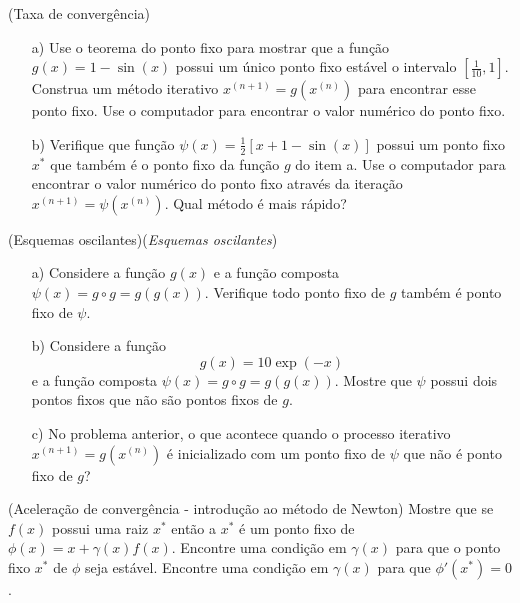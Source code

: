 \begin{exer}(Taxa de convergência)
\begin{itemize}
\item[a)] Use o teorema do ponto fixo para mostrar que a função $g(x)=1-\sin(x)$ possui um único ponto fixo estável o intervalo $[\frac{1}{10},1]$. Construa um método iterativo $x^{(n+1)}=g(x^{(n)})$ para encontrar esse ponto fixo. Use o computador para encontrar o valor numérico do ponto fixo.
\item[b)] Verifique que função $\psi(x)=\frac{1}{2}\left[x+1-\sin(x)\right]$ possui um ponto fixo $x^*$ que também é o ponto fixo da função $g$ do item a. Use o computador para encontrar o valor numérico do ponto fixo através da iteração $x^{(n+1)}=\psi(x^{(n)})$. Qual método é mais rápido?
\end{itemize}
\end{exer}


\begin{exer}(Esquemas oscilantes)(\textit{Esquemas oscilantes})
\begin{itemize}
\item[a)] Considere a função $g(x)$ e a função composta $\psi(x)=g\circ g=g\left(g(x)\right)$. Verifique todo ponto fixo de $g$ também é ponto fixo de $\psi$.

\item[b)]  Considere a função \begin{equation} g(x)=10\exp(-x) \end{equation} e a função composta $\psi(x)=g\circ g=g\left(g(x)\right)$. Mostre que $\psi$ possui dois pontos fixos que não são pontos fixos de $g$.

\item[c)]  No problema anterior, o que acontece quando o processo iterativo $x^{(n+1)}=g(x^{(n)})$ é inicializado com um ponto fixo de $\psi$ que não é ponto fixo de $g$?
\end{itemize}
\end{exer}

\begin{exer}(Aceleração de convergência - introdução ao método de Newton)\label{int_new1} Mostre que se $f(x)$ possui uma raiz $x^*$ então a $x^*$ é um ponto fixo de $\phi(x)=x+\gamma(x) f(x)$. Encontre uma condição em $\gamma(x)$ para que o ponto fixo $x^*$ de $\phi$ seja estável. Encontre uma condição em $\gamma(x)$ para que $\phi'(x^*)=0$.
\end{exer}

